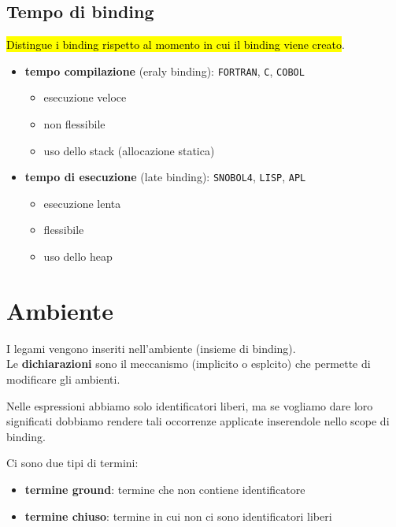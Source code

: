 \subsection{Tempo di binding}
\hl{Distingue i binding rispetto al momento in cui il binding viene creato}.
\begin{itemize}[label=$\diamond$, itemsep=\smallskipamount]
    \item \textbf{tempo compilazione} (eraly binding): \texttt{FORTRAN}, \texttt{C}, \texttt{COBOL}
    \begin{itemize}[itemsep=\smallskipamount]
        \item esecuzione veloce
        \item non flessibile
        \item uso dello stack (allocazione statica)
    \end{itemize}
    \item \textbf{tempo di esecuzione} (late binding): \texttt{SNOBOL4}, \texttt{LISP}, \texttt{APL}
    \begin{itemize}[itemsep=\smallskipamount]
        \item esecuzione lenta
        \item flessibile
        \item uso dello heap
    \end{itemize}
\end{itemize}

\section{Ambiente}
I legami vengono inseriti nell'ambiente (insieme di binding).\\[0.2ex]
Le \textbf{dichiarazioni} sono il meccanismo (implicito o esplcito) che permette di modificare gli ambienti.

\smallskip
Nelle espressioni abbiamo solo identificatori liberi, ma se vogliamo dare loro significati dobbiamo rendere tali occorrenze applicate inserendole nello scope di binding.

\smallskip
Ci sono due tipi di termini:
\begin{itemize}[label=$\triangleright$, itemsep=\smallskipamount]
    \item \textbf{termine ground}: termine che non contiene identificatore
    \item \textbf{termine chiuso}: termine in cui non ci sono identificatori liberi
\end{itemize}

